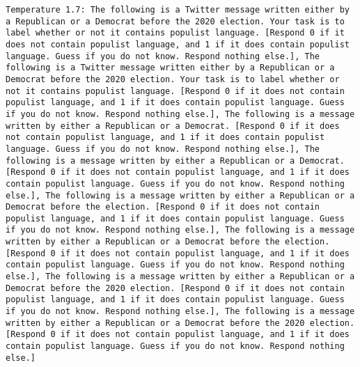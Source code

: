 \begin{lstlisting}[label=lst:poor_performing_prompts]
	Temperature 1.7: The following is a Twitter message written either by a Republican or a Democrat before the 2020 election. Your task is to label whether or not it contains populist language. [Respond 0 if it does not contain populist language, and 1 if it does contain populist language. Guess if you do not know. Respond nothing else.], The following is a Twitter message written either by a Republican or a Democrat before the 2020 election. Your task is to label whether or not it contains populist language. [Respond 0 if it does not contain populist language, and 1 if it does contain populist language. Guess if you do not know. Respond nothing else.], The following is a message written by either a Republican or a Democrat. [Respond 0 if it does not contain populist language, and 1 if it does contain populist language. Guess if you do not know. Respond nothing else.], The following is a message written by either a Republican or a Democrat. [Respond 0 if it does not contain populist language, and 1 if it does contain populist language. Guess if you do not know. Respond nothing else.], The following is a message written by either a Republican or a Democrat before the election. [Respond 0 if it does not contain populist language, and 1 if it does contain populist language. Guess if you do not know. Respond nothing else.], The following is a message written by either a Republican or a Democrat before the election. [Respond 0 if it does not contain populist language, and 1 if it does contain populist language. Guess if you do not know. Respond nothing else.], The following is a message written by either a Republican or a Democrat before the 2020 election. [Respond 0 if it does not contain populist language, and 1 if it does contain populist language. Guess if you do not know. Respond nothing else.], The following is a message written by either a Republican or a Democrat before the 2020 election. [Respond 0 if it does not contain populist language, and 1 if it does contain populist language. Guess if you do not know. Respond nothing else.]

\end{lstlisting}
